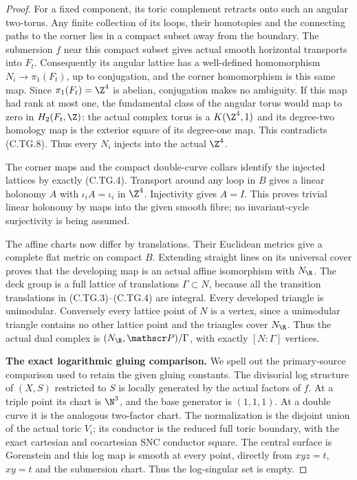 \begin{proof}
For a fixed component, its toric complement retracts
onto such an angular two-torus. Any finite collection
of its loops, their homotopies and the connecting
paths to the corner lies in a compact subset away
from the boundary. The submersion $f$ near this
compact subset gives actual smooth horizontal
transports into $F_t$. Consequently its angular
lattice has a well-defined homomorphism
$N_i\to\pi_1(F_t)$, up to conjugation, and the
corner homomorphism is this same map. Since
$\pi_1(F_t)=\Z^4$ is abelian, conjugation makes
no ambiguity. If this map had rank at most one,
the fundamental class of the angular torus would
map to zero in $H_2(F_t,\Z)$: the actual complex
torus is a $K(\Z^4,1)$ and its degree-two homology
map is the exterior square of its degree-one map.
This contradicts (C.TG.8). Thus every $N_i$
injects into the actual $\Z^4$.

The corner maps and the compact double-curve collars
identify the injected lattices by exactly (C.TG.4).
Transport around any loop in $B$ gives a linear
holonomy $A$ with $\iota_iA=\iota_i$ in $\Z^4$.
Injectivity gives $A=I$. This proves trivial linear
holonomy by maps into the given smooth fibre; no
invariant-cycle surjectivity is being assumed.

The affine charts now differ by translations.
Their Euclidean metrics give a complete flat metric
on compact $B$. Extending straight lines on its
universal cover proves that the developing map is
an actual affine isomorphism with $N_{\R}$.
The deck group is a full lattice of translations
$\Gamma\subset N$, because all the transition
translations in (C.TG.3)--(C.TG.4) are integral.
Every developed triangle is unimodular. Conversely
every lattice point of $N$ is a vertex, since a
unimodular triangle contains no other lattice point
and the triangles cover $N_{\R}$. Thus the actual
dual complex is $(N_{\R},\mathscr P)/\Gamma$,
with exactly $[N:\Gamma]$ vertices.

\par\medskip\noindent\textbf{The exact logarithmic gluing comparison.}
We spell out the primary-source comparison used to
retain the given gluing constants. The divisorial
log structure of $(X,S)$ restricted to $S$ is locally
generated by the actual factors of $f$. At a triple
point its chart is $\N^3$, and the base generator
is $(1,1,1)$. At a double curve it is the analogous
two-factor chart. The normalization is the disjoint
union of the actual toric $V_i$; its conductor is
the reduced full toric boundary, with the exact
cartesian and cocartesian SNC conductor square.
The central surface is Gorenstein and this log
map is smooth at every point, directly from
$xyz=t$, $xy=t$ and the submersion chart. Thus
the log-singular set is empty.


\end{proof}
